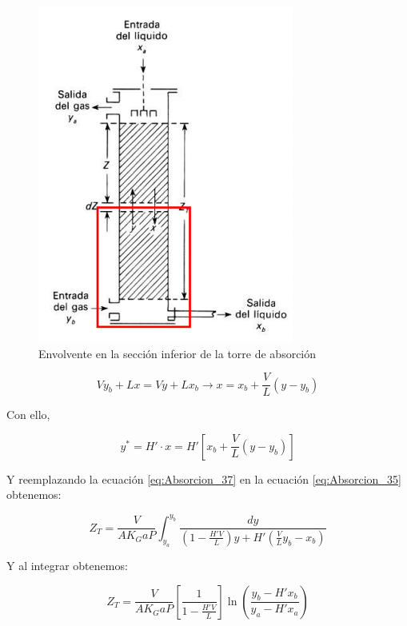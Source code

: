 \documentclass[11pt]{book}
\begin{document}
\begin{figure}
    \centering
    \includegraphics{img/absorcion/Absorcion_7.PNG}
    \caption{Envolvente en la sección inferior de la torre de absorción}
    \label{fig:Absorcion_7}
\end{figure}

\begin{equation}
    \label{eq:Absorcion_36}
    V y_b + L x = V y + L x_b  \longrightarrow x = x_b + \frac{V}{L} (y-y_b)
\end{equation}

Con ello,

\begin{equation}
    \label{eq:Absorcion_37}
    y^* = H' \cdot x = H' \left[ x_b + \frac{V}{L} (y-y_b) \right]
\end{equation}

Y reemplazando la ecuación \ref{eq:Absorcion_37} en la ecuación \ref{eq:Absorcion_35} obtenemos:

\begin{equation}
    \label{eq:Absorcion_38}
    Z_T = \frac{V}{A K_G a P}\int_{y_a}^{y_b} \frac{dy}{\left( 1 - \frac{H'V}{L}\right)y + H' \left( \frac{V}{L} y_b - x_b\right)}
\end{equation}

Y al integrar obtenemos:

\begin{equation}
    \label{eq:Absorcion_39}
    Z_T = \frac{V}{A K_G a P} \left[ \frac{1}{1-\frac{H'V}{L}} \right] \ln \left( \frac{y_b - H'x_b}{y_a - H'x_a} \right)
\end{equation}
\end{document}
